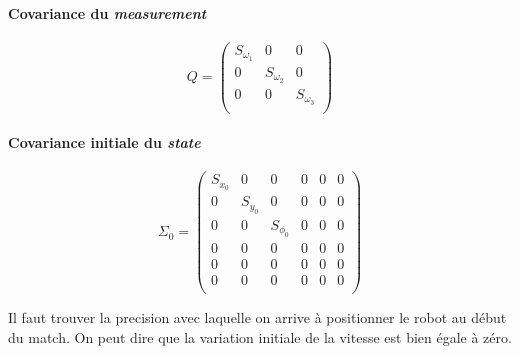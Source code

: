 \documentclass[a4paper]{paper}
\begin{document}
\paragraph{Covariance du \emph{measurement}}
\begin{equation}
    Q =
    \left( \begin{array}{ccc}
        S_{\omega_1} & 0 & 0 \\
        0 & S_{\omega_2} & 0 \\
        0 & 0 & S_{\omega_3} \\
    \end{array} \right)
\end{equation}

\paragraph{Covariance initiale du \emph{state}}
\begin{equation}
    \Sigma_0 =
    \left( \begin{array}{cccccc}
        S_{x_0} & 0 & 0 & 0 & 0 & 0 \\
        0 & S_{y_0} & 0 & 0 & 0 & 0 \\
        0 & 0 & S_{\phi_0} & 0 & 0 & 0 \\
        0 & 0 & 0 & 0 & 0 & 0 \\
        0 & 0 & 0 & 0 & 0 & 0 \\
        0 & 0 & 0 & 0 & 0 & 0 \\
    \end{array} \right)
\end{equation}

Il faut trouver la precision avec laquelle on arrive à positionner le robot au
début du match. On peut dire que la variation initiale de la vitesse est bien
égale à zéro.
\end{document}
